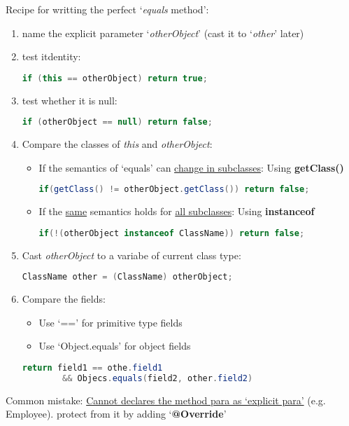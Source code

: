 \documentclass[12pt]{article}
\begin{document}
Recipe for writting the perfect `\emph{equals} method':
\begin{enumerate}
    \item name the explicit parameter `\emph{otherObject}' (cast it to `\emph{other}' later)
    \item test itdentity:
    \begin{lstlisting}[language=Java]
    if (this == otherObject) return true;
    \end{lstlisting}
    \item test whether it is null:
    \begin{lstlisting}[language=Java]
    if (otherObject == null) return false;
    \end{lstlisting}
    \item Compare the classes of \emph{this} and \emph{otherObject}:
    \begin{itemize}
        \item If the semantics of `equals' can \underline{change in subclasses}: Using \textbf{getClass()}
    \begin{lstlisting}[language=Java]
    if(getClass() != otherObject.getClass()) return false;
    \end{lstlisting}
        \item If the \underline{same} semantics holds for \underline{all subclasses}: Using \textbf{instanceof}
    \begin{lstlisting}[language=Java]
    if(!(otherObject instanceof ClassName)) return false;
    \end{lstlisting}
    \end{itemize}
    \item Cast \emph{otherObject} to a variabe of current class type:
    \begin{lstlisting}[language=Java]
    ClassName other = (ClassName) otherObject;
    \end{lstlisting}
    \item Compare the fields:
    \begin{itemize}
        \item Use `==' for primitive type fields
        \item Use `Object.equals' for object fields
    \end{itemize}
    \begin{lstlisting}[language=Java]
    return field1 == othe.field1
        && Objecs.equals(field2, other.field2)
    \end{lstlisting}
\end{enumerate}

Common mistake: \underline{Cannot declares the method para as `explicit para'} (e.g. Employee).
protect from it by adding `\textbf{@Override}'
\end{document}
